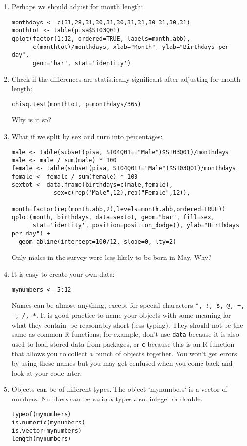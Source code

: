 \documentclass[11pt]{article}
\begin{document}
\begin{enumerate}
\item Perhaps we should adjust for month length:
\begin{verbatim}
monthdays <- c(31,28,31,30,31,30,31,31,30,31,30,31)
monthtot <- table(pisa$ST03Q01)
qplot(factor(1:12, ordered=TRUE, labels=month.abb), 
      c(monthtot)/monthdays, xlab="Month", ylab="Birthdays per day",
      geom='bar', stat='identity')
\end{verbatim}
\item Check if the differences are statistically significant after adjusting for month length:
\begin{verbatim}
chisq.test(monthtot, p=monthdays/365)
\end{verbatim}
Why is it so?

\item What if we split by sex and turn into percentages:
\begin{verbatim}
male <- table(subset(pisa, ST04Q01=="Male")$ST03Q01)/monthdays
male <- male / sum(male) * 100
female <- table(subset(pisa, ST04Q01!="Male")$ST03Q01)/monthdays
female <- female / sum(female) * 100
sextot <- data.frame(birthdays=c(male,female),
            sex=c(rep("Male",12),rep("Female",12)),
            month=factor(rep(month.abb,2),levels=month.abb,ordered=TRUE))
qplot(month, birthdays, data=sextot, geom="bar", fill=sex, 
      stat='identity', position=position_dodge(), ylab="Birthdays per day") +
  geom_abline(intercept=100/12, slope=0, lty=2)
\end{verbatim}
Only males in the survey were less likely to be born in May. Why?

\item It is easy to create your own data:

\begin{verbatim}
mynumbers <- 5:12
\end{verbatim}

Names can be almost anything, except for special characters \verb|^, !, $, @, +, -, /, *|. It is good practice to name your objects with some meaning for what they contain, be reasonably short (less typing). They should not be the same as common R functions; for example, don't use \verb|data| because it is also used to load stored data from packages, or \verb|c| because this is an R function that allows you to collect a bunch of objects together. You won't get errors by using these names but you may get confused when you come back and look at your code later. 


\item Objects can be of different types. The object `mynumbers` is a vector of numbers. Numbers can be various types also: integer or double.
\begin{verbatim}
typeof(mynumbers)
is.numeric(mynumbers)
is.vector(mynumbers)
length(mynumbers)
\end{verbatim}


\end{enumerate}
\end{document}
